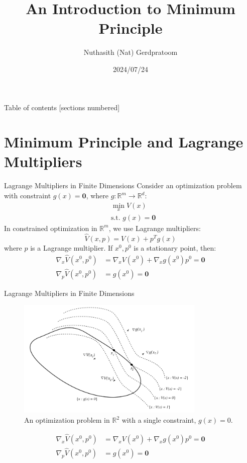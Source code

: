 \documentclass[10pt]{beamer}
\title{An Introduction to Minimum Principle}
\date{2024/07/24}
\author{Nuthasith (Nat) Gerdpratoom}
\institute{Control \& Optimization Laboratory}
\begin{document}
\maketitle

\begin{frame}{Table of contents}
  [sections numbered]
  \tableofcontents%
\end{frame}

\section{Minimum Principle and Lagrange Multipliers}

\begin{frame}{Lagrange Multipliers in Finite Dimensions}
  Consider an optimization problem with constraint \( g(x) = \mathbf{0} \), where \(g:\mathbb{R}^{m}\rightarrow \mathbb{R}^{d}\):
  \[
    \begin{aligned}
      &\min_x V(x) \\
      &\text{s.t. } g(x) = \mathbf{0}
    \end{aligned}
  \]
  In constrained optimization in \( \mathbb{R}^m \), we use Lagrange multipliers:
  \[
  \hat{V}(x, p) = V(x) + p^T g(x)
  \]
  where \( p \) is a Lagrange multiplier. If \( x^0, p^0 \) is a stationary point, then:
  \[
  \begin{aligned}
    \nabla_x \hat{V}(x^0, p^0) &= \nabla_x V(x^0) + \nabla_x g(x^0) p^0 = \mathbf{0}\\
    \nabla_p \hat{V}(x^0, p^0) &= g(x^0) = \mathbf{0}
  \end{aligned}
  \]
  \end{frame}

\begin{frame}{Lagrange Multipliers in Finite Dimensions}
  \begin{figure}
      \centering
      \includegraphics[width=0.8\textwidth]{photos/1.png}
      \caption{An optimization problem in \( \mathbb{R}^2 \) with a single constraint, $g(x)=0$.}
  \end{figure}
  \[
    \begin{aligned}
      \nabla_x \hat{V}(x^0, p^0) &= \nabla_x V(x^0) + \nabla_x g(x^0) p^0 = \mathbf{0}\\
      \nabla_p \hat{V}(x^0, p^0) &= g(x^0) = \mathbf{0}
    \end{aligned}
  \]
\end{frame}  
\end{document}
